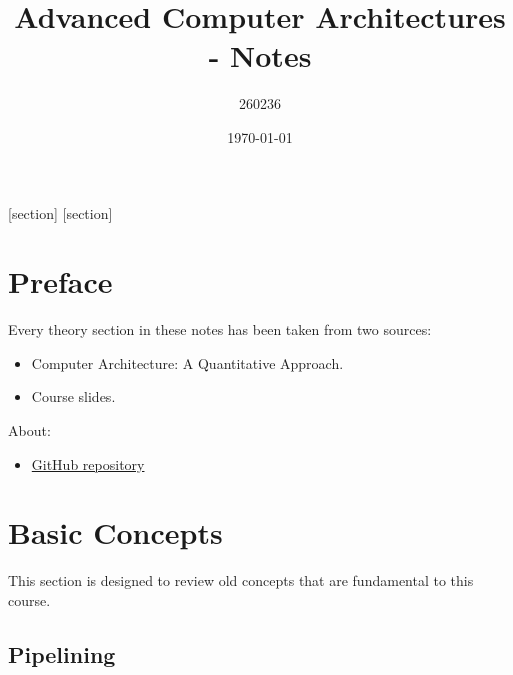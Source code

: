 \documentclass[a4paper]{article}
\begin{document}
    [section]
    [section]
    
    

    \author{260236}
	\title{Advanced Computer Architectures - Notes}
	\date{\printdayoff\today}
	\maketitle

	\newpage

    \section*{Preface}

    Every theory section in these notes has been taken from two sources:
    \begin{itemize}
        \item Computer Architecture: A Quantitative Approach.\cite{hennessy2017computer}
        \item Course slides.\cite{pipelining-slides}
    \end{itemize}
    About:
    \begin{itemize}
        \item[\faIcon{github}] \href{https://github.com/AndreVale69/HPC-E-PoliMI-university-notes}{GitHub repository}
    \end{itemize}
    
    \newpage
	
	\tableofcontents

    \newpage

    \section{Basic Concepts}

    This section is designed to review old concepts that are fundamental to this course.

    \subsection{Pipelining}
\end{document}
